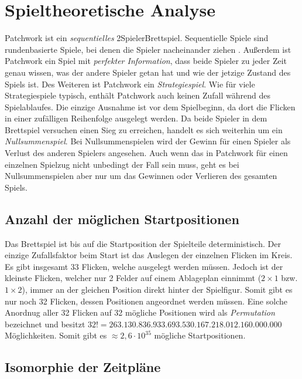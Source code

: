 \section{Spieltheoretische Analyse}

Patchwork ist ein \emph{sequentielles} 2\textendash{}Spieler\textendash{}Brettspiel. Sequentielle Spiele sind rundenbasierte Spiele, bei denen die Spieler nacheinander ziehen \cite[S. 53]{2014.GameTheoryThroughExamples}. Außerdem ist Patchwork ein Spiel mit \emph{perfekter Information}, \dash dass beide Spieler zu jeder Zeit genau wissen, was der andere Spieler getan hat und wie der jetzige Zustand des Spiels ist. Des Weiteren ist Patchwork ein \emph{Strategiespiel}. Wie für viele Strategiespiele typisch, enthält Patchwork auch keinen Zufall während des Spielablaufes. Die einzige Ausnahme ist vor dem Spielbeginn, da dort die Flicken in einer zufälligen Reihenfolge ausgelegt werden. Da beide Spieler in dem Brettspiel versuchen einen Sieg zu erreichen, handelt es sich weiterhin um ein \emph{Nullsummenspiel}. Bei Nullsummenspielen wird der Gewinn für einen Spieler als Verlust des anderen Spielers angesehen. Auch wenn das in Patchwork für einen einzelnen Spielzug nicht unbedingt der Fall sein muss, geht es bei Nullsummenspielen aber nur um das Gewinnen oder Verlieren des gesamten Spiels.

\subsection*{Anzahl der möglichen Startpositionen}

Das Brettspiel ist bis auf die Startposition der Spielteile deterministisch. Der einzige Zufallsfaktor beim Start ist das Auslegen der einzelnen Flicken im Kreis. Es gibt insgesamt 33 Flicken, welche ausgelegt werden müssen. Jedoch ist der kleinste Flicken, welcher nur 2 Felder auf einem Ablageplan einnimmt ($2\times1$ bzw. $1\times2$), immer an der gleichen Position direkt hinter der Spielfigur. Somit gibt es nur noch 32 Flicken, dessen Positionen angeordnet werden müssen. Eine solche Anordnug aller 32 Flicken auf 32 mögliche Positionen wird als \emph{Permutation} bezeichnet und besitzt $32! = 263.130.836.933.693.530.167.218.012.160.000.000$ Möglichkeiten. Somit gibt es $\approx 2{,}6 \cdot 10^{35}$ mögliche Startpositionen.

\subsection*{Isomorphie der Zeitpläne}

